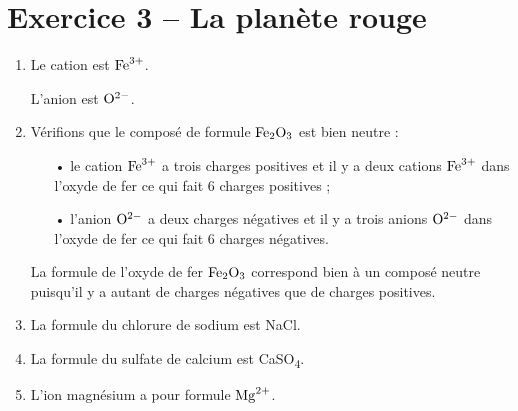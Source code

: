 \documentclass[12pt,a4paper]{article}
\begin{document}
\section*{Exercice 3 -- La planète rouge}

\begin{enumerate}
\item Le cation est $\mathrm{Fe}^\mathrm{3+}$.

L'anion est $\mathrm{O}^\mathrm{2-}$.

\item 
Vérifions que le composé de formule $\mathrm{Fe}_\mathrm{2}\mathrm{O}_\mathrm{3}$ est bien neutre :
\begin{itemize}
\item[•] le cation $\mathrm{Fe}^\mathrm{3+}$ a trois charges positives et il y a deux cations $\mathrm{Fe}^\mathrm{3+}$ dans l'oxyde de fer ce qui fait 6 charges positives ;
\item[•] l'anion $\mathrm{O}^\mathrm{2-}$ a deux charges négatives et il y a trois anions $\mathrm{O}^\mathrm{2-}$ dans l'oxyde de fer ce qui fait 6 charges négatives.
\end{itemize}
La formule de l'oxyde de fer $\mathrm{Fe}_\mathrm{2}\mathrm{O}_\mathrm{3}$ correspond bien à un composé neutre puisqu'il y a autant de charges négatives que de charges positives.

\item
La formule du chlorure de sodium est NaCl.

\item
La formule du sulfate de calcium est CaSO\textsubscript{4}.

\item
L'ion magnésium a pour formule $\mathrm{Mg}^\mathrm{2+}$.
\end{enumerate}
\end{document}
